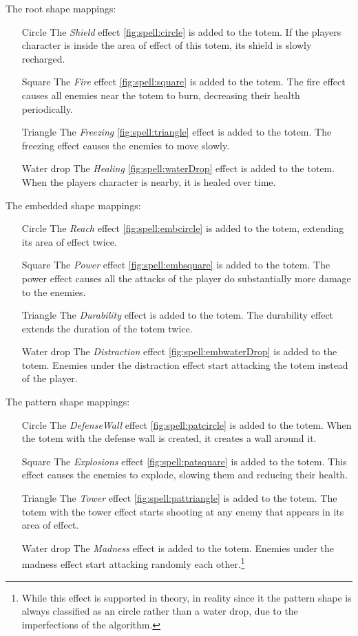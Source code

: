 \begin{description}
	\item The root shape mappings: 
	\begin{itemize}
		\item[Circle] The \emph{Shield} effect \ref{fig:spell:circle} is added to the totem. If the players character is inside the area of effect of this totem, its shield is slowly recharged.
		\item[Square] The \emph{Fire} effect \ref{fig:spell:square} is added to the totem. The fire effect causes all enemies near the totem to burn, decreasing their health periodically.
		\item[Triangle] The \emph{Freezing} \ref{fig:spell:triangle} effect is added to the totem. The freezing effect causes the enemies to move slowly.
		\item[Water drop] The \emph{Healing} \ref{fig:spell:waterDrop} effect is added to the totem. When the players character is nearby, it is healed over time.
	\end{itemize}
	\item The embedded shape mappings:
	\begin{itemize}
		\item[Circle] The \emph{Reach} effect \ref{fig:spell:embcircle} is added to the totem, extending its area of effect twice.
		\item[Square] The \emph{Power} effect \ref{fig:spell:embsquare} is added to the totem. The power effect causes all the attacks of the player do substantially more damage to the enemies.
		\item[Triangle] The \emph{Durability} effect is added to the totem. The durability effect extends the duration of the totem twice.
		\item[Water drop] The \emph{Distraction} effect \ref{fig:spell:embwaterDrop} is added to the totem. Enemies under the distraction effect start attacking the totem instead of the player.
	\end{itemize}
	\item The pattern shape mappings:
	\begin{itemize}
		\item[Circle] The \emph{DefenseWall} effect \ref{fig:spell:patcircle} is added to the totem. When the totem with the defense wall is created, it creates a wall around it.
		\item[Square] The \emph{Explosions} effect \ref{fig:spell:patsquare} is added to the totem. This effect causes the enemies to explode, slowing them and reducing their health.
		\item[Triangle] The \emph{Tower} effect \ref{fig:spell:pattriangle} is added to the totem. The totem with the tower effect starts shooting at any enemy that appears in its area of effect.
		\item[Water drop] The \emph{Madness} effect is added to the totem. Enemies under the madness effect start attacking randomly each other.\footnote {While this effect is supported in theory, in reality since it the pattern shape is always classified as an circle rather than a water drop, due to the imperfections of the algorithm.}
	\end{itemize}
\end{description}

